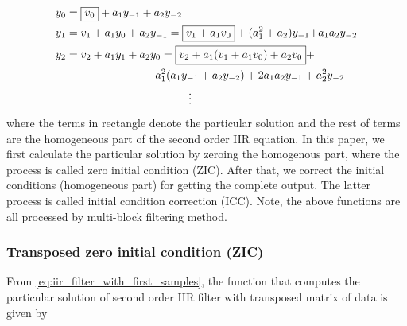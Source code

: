\begin{equation}
    \label{eq:iir_filter_with_first_samples}
    \begin{aligned}
    & y_0 = \fbox{$v_0$} + a_1y_{-1} + a_2y_{-2} \\
    & y_1 = v_1 + a_1y_0 + a_2y_{-1} = \fbox{$v_1 + a_1v_0$} + (a_1^2+a_2)y_{-1}{+}a_1a_2y_{-2} \\
    & y_2 = v_2 + a_1y_1 + a_2y_0 = \fbox{$v_2 + a_1(v_1+a_1v_0) + a_2v_0$} + \\
    & \quad\quad\quad\quad\quad\quad\quad\quad\quad a_1^2(a_1y_{-1}+a_2y_{-2})+2a_1a_2y_{-1}+a_2^2y_{-2} \\
    & \quad\quad\quad\quad\quad\quad\quad\quad\quad\quad\quad\quad \vdots
    \end{aligned}
\end{equation}
where the terms in rectangle denote the particular solution and
the rest of terms are the homogeneous part of the second order IIR equation.
In this paper, we first calculate the particular solution by zeroing the homogenous part, where
the process is called zero initial condition (ZIC). After that, we correct the initial conditions (homogeneous part) for
getting the complete output. The latter process is called initial condition correction (ICC). Note, the above functions
are all processed by multi-block filtering method.

\subsubsection{Transposed zero initial condition (ZIC)}

From \eqref{eq:iir_filter_with_first_samples}, the function that computes the particular solution 
of second order IIR filter with transposed matrix of data is given by

